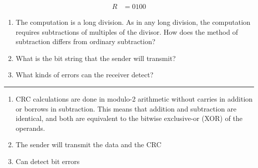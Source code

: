 \documentclass[twoside]{article}
\newenvironment{answer}
  {\vspace*{0.2cm} \rule{12cm}{0.04cm} \vspace*{0.2cm}}
  {\vspace*{0.2cm}}
\begin{document}
\begin{enumerate}
  \begin{align*}
    R & = 0100
    \end{align*}

  \begin{enumerate}
    \item The computation is a long division. As in any long division, the computation
      requires subtractions of multiples of the divisor. How does the method of subtraction
      differs from ordinary subtraction? 
    \item What is the bit string that the sender will transmit?
    \item What kinds of errors can the receiver detect?
    \end{enumerate}

  \begin{answer}

  \begin{enumerate}
    \item CRC calculations are done in modulo-2 arithmetic without carries in addition or borrows in subtraction. This means that addition and subtraction are identical, and both are equivalent to the bitwise exclusive-or (XOR) of the operands.
    \item The sender will transmit the data and the CRC
    \item Can detect bit errors
    \end{enumerate}

    \end{answer}

  \end{enumerate}
\end{document}
